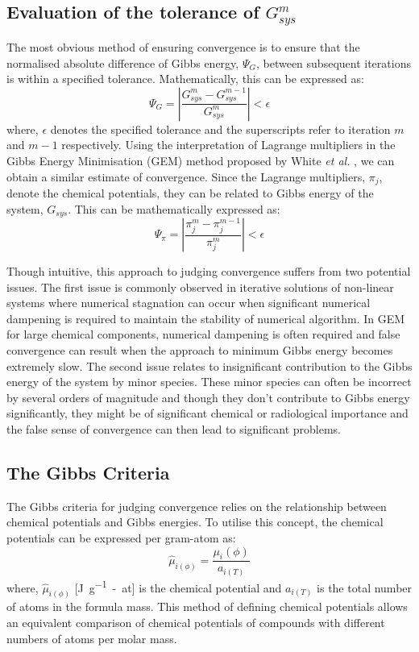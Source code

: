 		\subsection{Evaluation of the tolerance of $G_{sys}^m$}
		The most obvious method of ensuring convergence is to ensure that the normalised absolute difference of Gibbs energy, $\Psi_G$, between subsequent iterations is within a specified tolerance. Mathematically, this can be expressed as:
		\begin{equation}\label{eqn:conv1}
			\Psi_G = \left \vert \frac{G_{sys}^{m} - G_{sys}^{m-1}}{G_{sys}^{m}} \right \vert < \epsilon
		\end{equation}
		where, $\epsilon$ denotes the specified tolerance and the superscripts refer to iteration $m$ and $m-1$ respectively. Using the interpretation of Lagrange multipliers in the Gibbs Energy Minimisation (GEM) method proposed by White \textit{et al.} \cite{White58a}, we can obtain a similar estimate of convergence. Since the Lagrange multipliers, $\pi_{j}$, denote the chemical potentials, they can be related to Gibbs energy of the system, $G_{sys}$. This can be mathematically expressed as:
		\begin{equation}\label{eqn:conv2}
			\Psi_{\pi} = \left \vert \frac{\pi_{j}^{m} - \pi_{j}^{m-1}}{\pi_{j}^{m}} \right \vert < \epsilon
		\end{equation}

		Though intuitive, this approach to judging convergence suffers from two potential issues. The first issue is commonly observed in iterative solutions of non-linear systems where numerical stagnation can occur when significant numerical dampening is required to maintain the stability of numerical algorithm. In GEM for large chemical components, numerical dampening is often required and false convergence can result when the approach to minimum Gibbs energy becomes extremely slow.  The second issue relates to insignificant contribution to the Gibbs energy of the system  by minor species. These minor species can often be incorrect by several orders of magnitude and though they don't contribute to Gibbs energy significantly, they might be of significant chemical or radiological importance and the false sense of convergence can then lead to significant problems.

		\subsection{The Gibbs Criteria}
	 The Gibbs criteria for judging convergence relies on the relationship between chemical potentials and Gibbs energies. To utilise this concept, the chemical potentials can be expressed per gram-atom as:
	 \begin{equation}
	 	\hat{\mu}_{i(\phi)} = \frac{{\mu}_i(\phi)}{a_{i(T)}}
	 \end{equation}
	 where, $\hat{\mu}_{i(\phi)}$ [\si{\joule \per g-at}] is the chemical potential and ${a_{i(T)}}$  is the total number of atoms in the formula mass. This method of defining chemical potentials allows an equivalent comparison of chemical potentials of compounds with different numbers of atoms per molar mass.

